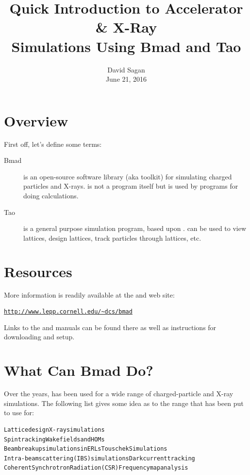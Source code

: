 \documentclass{hitec}
\title{Quick Introduction to Accelerator \& X-Ray \\ Simulations Using Bmad and Tao}
\author{}
\date{David Sagan \\ June 21, 2016}
\begin{document}
\maketitle

\section{Overview}

First off, let's define some terms:
  \begin{description}
  \item[Bmad] \Newline
\bmad is an open-source software library (aka toolkit) for simulating charged particles
and X-rays. \bmad is not a program itself but is used by programs for doing
calculations. 
  \item[Tao] \Newline
\tao is a general purpose simulation program, based upon \bmad. \tao can be used to
view lattices, design lattices, track particles through lattices, etc.
  \end{description}

\section{Resources}

More information is readily available at the \bmad and \tao web site:
\begin{alltt}
  \url{http://www.lepp.cornell.edu/~dcs/bmad}
\end{alltt}
Links to the \bmad and \tao manuals can be found there as well as instructions for
downloading and setup.

\section{What Can Bmad Do?}

Over the years, \bmad has been used for a wide range of charged-particle and X-ray
simulations. The following list gives some idea as to the range that \bmad has been put to use
for:
\begin{alltt}
  Lattice design                              X-ray simulations
  Spin tracking                               Wakefields and HOMs
  Beam breakup simulations in ERLs            Touschek Simulations
  Intra-beam scattering (IBS) simulations     Dark current tracking
  Coherent Synchrotron Radiation (CSR)        Frequency map analysis
\end{alltt}
\end{document}
